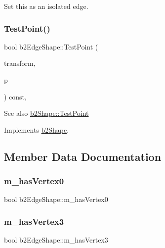 Set this as an isolated edge. 

\mbox{\label{classb2_edge_shape_a15151673cf9ad585779c70363425f470}} 
\subsubsection{\texorpdfstring{TestPoint()}{TestPoint()}}
{\footnotesize\ttfamily bool b2\+Edge\+Shape\+::\+Test\+Point (\begin{DoxyParamCaption}\item[{const \mbox{\hyperlink{structb2_transform}{b2\+Transform}} \&}]{transform,  }\item[{const \mbox{\hyperlink{structb2_vec2}{b2\+Vec2}} \&}]{p }\end{DoxyParamCaption}) const\hspace{0.3cm}{\ttfamily [override]}, {\ttfamily [virtual]}}

\begin{DoxySeeAlso}{See also}
\mbox{\hyperlink{classb2_shape_a6ac968e403e2d93e8ae46d728a2e50fa}{b2\+Shape\+::\+Test\+Point}} 
\end{DoxySeeAlso}


Implements \mbox{\hyperlink{classb2_shape_a6ac968e403e2d93e8ae46d728a2e50fa}{b2\+Shape}}.



\subsection{Member Data Documentation}
\mbox{\label{classb2_edge_shape_a1d0f39259f0963146b343d6b048f3f8a}} 
\subsubsection{\texorpdfstring{m\_hasVertex0}{m\_hasVertex0}}
{\footnotesize\ttfamily bool b2\+Edge\+Shape\+::m\+\_\+has\+Vertex0}

\mbox{\label{classb2_edge_shape_afeb0dfac66fe677ccd765d48610fa56f}} 
\subsubsection{\texorpdfstring{m\_hasVertex3}{m\_hasVertex3}}
{\footnotesize\ttfamily bool b2\+Edge\+Shape\+::m\+\_\+has\+Vertex3}

